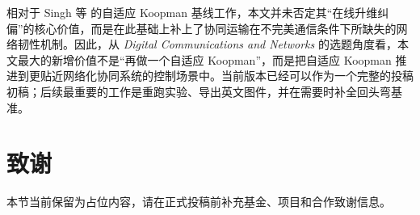 \documentclass[twocolumn,3p,times,procedia]{elsarticle}
\begin{document}
相对于 Singh 等 \cite{singh2024adaptive} 的自适应 Koopman 基线工作，本文并未否定其“在线升维纠偏”的核心价值，而是在此基础上补上了协同运输在不完美通信条件下所缺失的网络韧性机制。因此，从 \emph{Digital Communications and Networks} 的选题角度看，本文最大的新增价值不是“再做一个自适应 Koopman”，而是把自适应 Koopman 推进到更贴近网络化协同系统的控制场景中。当前版本已经可以作为一个完整的投稿初稿；后续最重要的工作是重跑实验、导出英文图件，并在需要时补全回头弯基准。

\section*{致谢}
本节当前保留为占位内容，请在正式投稿前补充基金、项目和合作致谢信息。


\balance

\end{document}
